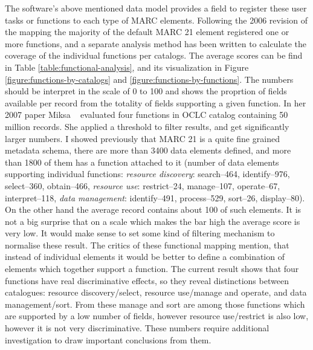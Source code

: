 The software's above mentioned data model provides a field to register these user tasks or functions to each type of MARC elements. Following the 2006 revision of the mapping the majority of the default MARC 21 element registered one or more functions, and a separate analysis method has been written to calculate the coverage of the individual functions per catalogs. The average scores can be find in Table \ref{table:functional-analysis}, and its visualization in Figure \ref{figure:functions-by-catalogs} and \ref{figure:functions-by-functions}. The numbers should be interpret in the scale of 0 to 100 and shows the proprtion of fields available per record from the totality of fields supporting a given function. In her 2007 paper Miksa ~\cite{miksa2007} evaluated four functions in OCLC catalog containing 50 million records. She applied a threshold to filter results, and get significantly larger numbers. I showed previously that MARC 21 is a quite fine grained metadata schema, there are more than 3400 data elements defined, and more than 1800 of them has a function attached to it (number of data elements supporting individual functions: \emph{resource discovery}: search--464, identify--976, select--360, obtain--466, \emph{resource use}: restrict--24, manage--107, operate--67, interpret--118, \emph{data management}: identify--491, process--529, sort--26, display--80). On the other hand the average record contains about 100 of such elements. It is not a big surprise that on a scale which makes the bar high the average score is very low. It would make sense to set some kind of filtering mechanism to normalise these result. The critics of these functional mapping \cite{miksa2007, harej2013} mention, that instead of individual elements it would be better to define a combination of elements which together support a function. The current result shows that four functions have real discriminative effects, so they reveal distinctions between catalogues: resource discovery/select, resource use/manage and operate, and data management/sort. From these manage and sort are among those functions which are supported by a low number of fields, however resource use/restrict is also low, however it is not very discriminative. These numbers require additional investigation to draw important conclusions from them.

